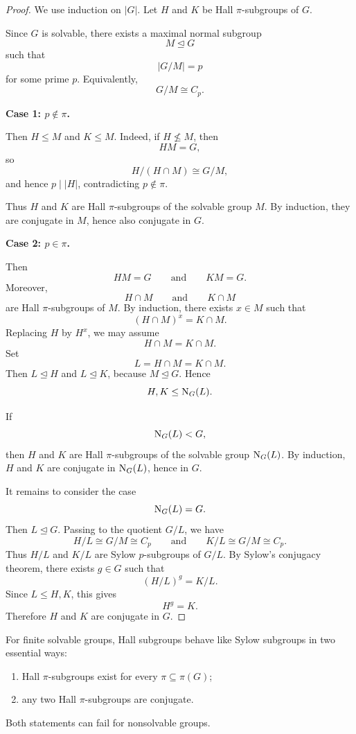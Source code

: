 \begin{proof}
We use induction on \(|G|\). Let \(H\) and \(K\) be Hall \(\pi\)-subgroups of
\(G\).

Since \(G\) is solvable, there exists a maximal normal subgroup
\[
    M\trianglelefteq G
\]
such that
\[
    |G/M|=p
\]
for some prime \(p\). Equivalently,
\[
    G/M\cong C_p.
\]

\medskip

\noindent
\textbf{Case 1: \(p\notin \pi\).}

Then \(H\leq M\) and \(K\leq M\). Indeed, if \(H\not\leq M\), then
\[
    HM=G,
\]
so
\[
    H/(H\cap M)\cong G/M,
\]
and hence \(p\mid |H|\), contradicting \(p\notin \pi\).

Thus \(H\) and \(K\) are Hall \(\pi\)-subgroups of the solvable group \(M\).
By induction, they are conjugate in \(M\), hence also conjugate in \(G\).

\medskip

\noindent
\textbf{Case 2: \(p\in \pi\).}

Then
\[
    HM=G
    \qquad\text{and}\qquad
    KM=G.
\]
Moreover,
\[
    H\cap M
    \qquad\text{and}\qquad
    K\cap M
\]
are Hall \(\pi\)-subgroups of \(M\). By induction, there exists \(x\in M\) such
that
\[
    (H\cap M)^x=K\cap M.
\]
Replacing \(H\) by \(H^x\), we may assume
\[
    H\cap M=K\cap M.
\]
Set
\[
    L=H\cap M=K\cap M.
\]
Then \(L\trianglelefteq H\) and \(L\trianglelefteq K\), because \(M\trianglelefteq G\).
Hence
\[
    H,K\leq \mathrm{N}_{G}(L).
\]

If
\[
    \mathrm{N}_{G}(L)<G,
\]
then \(H\) and \(K\) are Hall \(\pi\)-subgroups of the solvable group
\(\mathrm{N}_{G}(L)\). By induction, \(H\) and \(K\) are conjugate in \(\mathrm{N}_{G}(L)\), hence
in \(G\).

It remains to consider the case
\[
    \mathrm{N}_{G}(L)=G.
\]
Then \(L\trianglelefteq G\). Passing to the quotient \(G/L\), we have
\[
    H/L\cong G/M\cong C_p
    \qquad\text{and}\qquad
    K/L\cong G/M\cong C_p.
\]
Thus \(H/L\) and \(K/L\) are Sylow \(p\)-subgroups of \(G/L\). By Sylow's
conjugacy theorem, there exists \(g\in G\) such that
\[
    (H/L)^g=K/L.
\]
Since \(L\leq H,K\), this gives
\[
    H^g=K.
\]
Therefore \(H\) and \(K\) are conjugate in \(G\).
\end{proof}

\begin{remark}
For finite solvable groups, Hall subgroups behave like Sylow subgroups in two
essential ways:
\begin{enumerate}[label=\textup{(\arabic*)}]
    \item Hall \(\pi\)-subgroups exist for every \(\pi\subseteq \pi(G)\);
    \item any two Hall \(\pi\)-subgroups are conjugate.
\end{enumerate}
Both statements can fail for nonsolvable groups.
\end{remark}